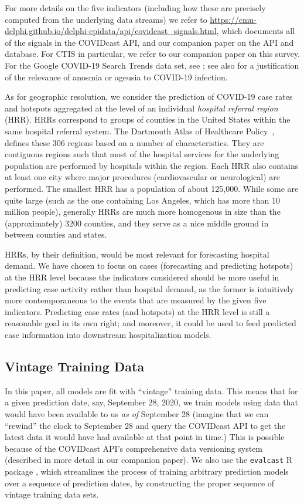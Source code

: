 \documentclass[9pt,twocolumn,twoside,lineno]{pnas-new}
\begin{document}
For more details on the five indicators (including how these are precisely
computed from the underlying data streams) we refer to
\url{https://cmu-delphi.github.io/delphi-epidata/api/covidcast_signals.html},
which documents all of the signals in the COVIDcast API, and our companion paper
on the API and database. For CTIS in particular, we refer to our companion paper
on this survey. For the Google COVID-19 Search Trends data set, see
\cite{GoogleSymptoms}; see also \cite{Klopfen:2020, Vaira:2020} for a 
justification of the relevance of anosmia or ageusia to COVID-19 infection. 

As for geographic resolution, we consider the prediction of COVID-19 case rates
and hotspots aggregated at the level of an individual \textit{hospital referral
  region} (HRR). HRRs correspond to groups of counties in the United States
within the same hospital referral system. The Dartmouth Atlas of Healthcare 
Policy~\cite{DartmouthHRR}, defines these 306 regions based on a number of
characteristics. They are contiguous regions such that most of the hospital
services for the underlying population are performed by hospitals within the
region. Each HRR also contains at least one city where major procedures
(cardiovascular or neurological) are performed. The smallest HRR has a
population of about 125,000. While some are quite large (such as the one
containing Los Angeles, which has more than 10 million people), generally HRRs  
are much more homogenous in size than the (approximately) 3200 counties,  
and they serve as a nice middle ground in between counties and states.  

HRRs, by their definition, would be most relevant for forecasting hospital
demand.  We have chosen to focus on cases (forecasting and predicting
hotspots) at the HRR level because the indicators considered should be more 
useful in predicting case activity rather than hospital demand, as the former is  
intuitively more contemporaneous to the events that are measured by
the given five indicators. Predicting case rates (and hotspots) at the HRR level
is still a reasonable goal in its own right; and moreover, it could be used to
feed predicted case information into downstream hospitalization models.

\subsection{Vintage Training Data}

In this paper, all models are fit with ``vintage'' training data. This means
that for a given prediction date, say, September 28, 2020, we train models 
using data that would have been available to us \textit{as of}
September 28 (imagine that we can ``rewind'' the clock to September 28 and query
the COVIDcast API to get the latest data it would have had available at that
point in time.)  This is possible because of the COVIDcast API's comprehensive
data versioning system (described in more detail in our companion paper).  We
also use the \texttt{evalcast} R package \cite{EvalcastR}, which streamlines the 
process of training arbitrary prediction models over a sequence of prediction
dates, by constructing the proper sequence of vintage training data sets.   
\end{document}
